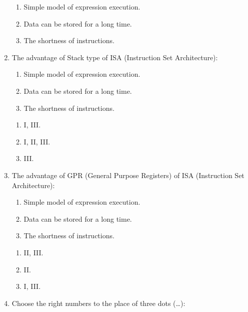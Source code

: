 \documentclass[paper=8.2in:11.6in]{scrartcl}
\begin{document}
\begin{enumerate}
\begin{enumerate}[label=\alph*)]
\item Simple model of expression execution.
\item Data can be stored for a long time.
\item The shortness of instructions.

\end{enumerate}

\item The advantage of Stack type of ISA (Instruction Set Architecture):

\begin{enumerate}[label=\Roman*.]

\item Simple model of expression execution.
\item Data can be stored for a long time.
\item The shortness of instructions.

\end{enumerate}

\begin{enumerate}[label=\alph*)]

\item I, III.
\item I, II, III.
\item III.

\end{enumerate}

\item The advantage of GPR (General Purpose Registers) of ISA (Instruction Set Architecture):

\begin{enumerate}[label=\Roman*.]

\item Simple model of expression execution.
\item Data can be stored for a long time.
\item The shortness of instructions.

\end{enumerate}

\begin{enumerate}[label=\alph*)]

\item II, III.
\item II.
\item I, III.

\end{enumerate}

\item Choose the right numbers to the place of three dots (\ldots):


\end{enumerate}
\end{document}
